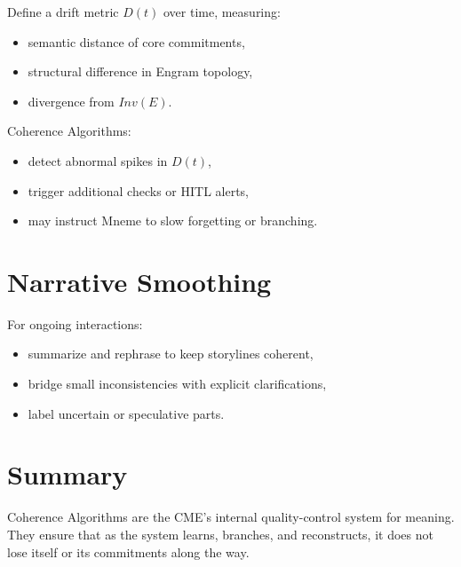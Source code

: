 Define a drift metric $D(t)$ over time, measuring:
\begin{itemize}
    \item semantic distance of core commitments,
    \item structural difference in Engram topology,
    \item divergence from $Inv(E)$.
\end{itemize}

Coherence Algorithms:
\begin{itemize}
    \item detect abnormal spikes in $D(t)$,
    \item trigger additional checks or HITL alerts,
    \item may instruct Mneme to slow forgetting or branching.
\end{itemize}

\section{Narrative Smoothing}

For ongoing interactions:
\begin{itemize}
    \item summarize and rephrase to keep storylines coherent,
    \item bridge small inconsistencies with explicit clarifications,
    \item label uncertain or speculative parts.
\end{itemize}

\section{Summary}

Coherence Algorithms are the CME’s internal quality-control system for meaning.
They ensure that as the system learns, branches, and reconstructs, it does not
lose itself or its commitments along the way.
